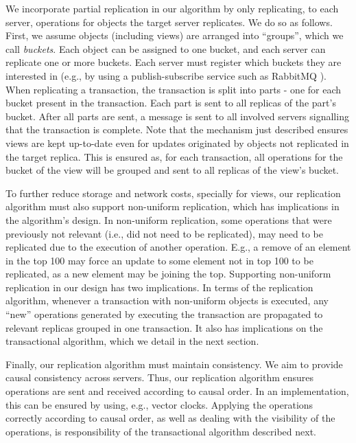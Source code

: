 We incorporate partial replication in our algorithm by only replicating, to each server, operations for objects the target server replicates.
We do so as follows.
First, we assume objects (including views) are arranged into ``groups'', which we call \emph{buckets}.
Each object can be assigned to one bucket, and each server can replicate one or more buckets.
Each server must register which buckets they are interested in (e.g., by using a publish-subscribe service such as RabbitMQ \cite{rabbitmq}).
When replicating a transaction, the transaction is split into parts - one for each bucket present in the transaction.
Each part is sent to all replicas of the part's bucket.
After all parts are sent, a message is sent to all involved servers signalling that the transaction is complete.
Note that the mechanism just described ensures views are kept up-to-date even for updates originated by objects not replicated in the target replica.
This is ensured as, for each transaction, all operations for the bucket of the view will be grouped and sent to all replicas of the view's bucket.


To further reduce storage and network costs, specially for views, our replication algorithm must also support non-uniform replication, which has implications in the algorithm's design.
In non-uniform replication, some operations that were previously not relevant (i.e., did not need to be replicated), may need to be replicated due to the execution of another operation.
E.g., a remove of an element in the top 100 may force an update to some element not in top 100 to be replicated, as a new element may be joining the top.
Supporting non-uniform replication in our design has two implications.
In terms of the replication algorithm, whenever a transaction with non-uniform objects is executed, any ``new'' operations generated by executing the transaction are propagated to relevant replicas grouped in one transaction.
It also has implications on the transactional algorithm, which we detail in the next section.

Finally, our replication algorithm must maintain consistency.
We aim to provide causal consistency across servers.
Thus, our replication algorithm ensures operations are sent and received according to causal order.
In an implementation, this can be ensured by using, e.g., vector clocks.
Applying the operations correctly according to causal order, as well as dealing with the visibility of the operations, is responsibility of the transactional algorithm described next.


